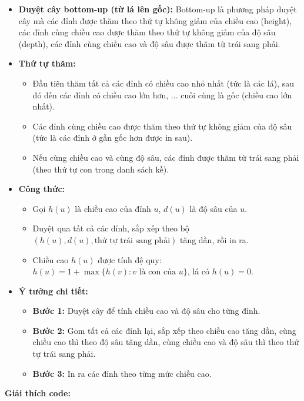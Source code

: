 \documentclass{article}
\begin{document}
\begin{itemize}
    \item \textbf{Duyệt cây bottom-up (từ lá lên gốc):} Bottom-up là phương pháp duyệt cây mà các đỉnh được thăm theo thứ tự không giảm của chiều cao (height), các đỉnh cùng chiều cao được thăm theo thứ tự không giảm của độ sâu (depth), các đỉnh cùng chiều cao và độ sâu được thăm từ trái sang phải.
    \item \textbf{Thứ tự thăm:}
    \begin{itemize}
        \item Đầu tiên thăm tất cả các đỉnh có chiều cao nhỏ nhất (tức là các lá), sau đó đến các đỉnh có chiều cao lớn hơn, ... cuối cùng là gốc (chiều cao lớn nhất).
        \item Các đỉnh cùng chiều cao được thăm theo thứ tự không giảm của độ sâu (tức là các đỉnh ở gần gốc hơn được in sau).
        \item Nếu cùng chiều cao và cùng độ sâu, các đỉnh được thăm từ trái sang phải (theo thứ tự con trong danh sách kề).
    \end{itemize}
    \item \textbf{Công thức:}
    \begin{itemize}
        \item Gọi $h(u)$ là chiều cao của đỉnh $u$, $d(u)$ là độ sâu của $u$.
        \item Duyệt qua tất cả các đỉnh, sắp xếp theo bộ $(h(u), d(u), \text{thứ tự trái sang phải})$ tăng dần, rồi in ra.
        \item Chiều cao $h(u)$ được tính đệ quy: $h(u) = 1 + \max\{h(v) : v \text{ là con của } u\}$, lá có $h(u) = 0$.
    \end{itemize}
    \item \textbf{Ý tưởng chi tiết:}
    \begin{itemize}
        \item \textbf{Bước 1:} Duyệt cây để tính chiều cao và độ sâu cho từng đỉnh.
        \item \textbf{Bước 2:} Gom tất cả các đỉnh lại, sắp xếp theo chiều cao tăng dần, cùng chiều cao thì theo độ sâu tăng dần, cùng chiều cao và độ sâu thì theo thứ tự trái sang phải.
        \item \textbf{Bước 3:} In ra các đỉnh theo từng mức chiều cao.
    \end{itemize}
\end{itemize}

\textbf{Giải thích code:}
\end{document}
